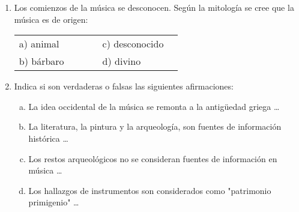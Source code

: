 \documentclass[letterpaper,12pt,notitlepage,spanish]{article}
\begin{document}
%
\begin{ejercicio}	
	\begin{enumerate}[1.-]
%
%
		\item  
		Los comienzos de la música se desconocen. Según la mitología se cree que la música es de origen:\par
	\begin{tabular}{l l l l l l}
	a) animal &  &  &   & c) desconocido &  \\
	b) bárbaro &  &  &  & d) divino &  \\
	\end{tabular} 
%
%
	\item 	Indica si son verdaderas o falsas las siguientes afirmaciones: \par		
		\begin{enumerate}[a)]
			\item La idea occidental de la música se remonta a la antigüedad griega \ldots
			\item La literatura, la pintura y la arqueología, son fuentes de información histórica \ldots 
			\item Los restos arqueológicos no se consideran fuentes de información en música \ldots
			\item Los hallazgos de instrumentos son considerados como "patrimonio primigenio" \ldots
		\end{enumerate} 
	\end{enumerate}
\end{ejercicio}
%
%
\end{document}

